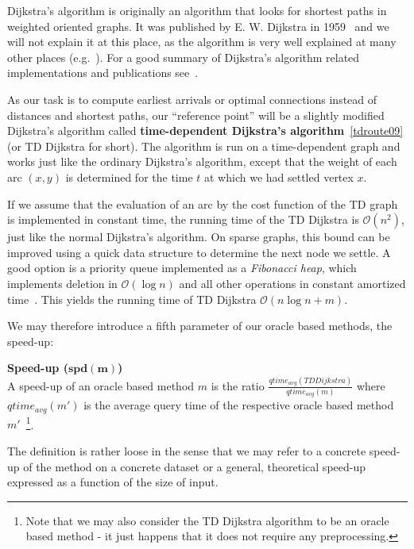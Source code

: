 	Dijkstra's algorithm is originally an algorithm that looks for shortest paths in weighted oriented graphs. It was published by E. W. Dijkstra in 1959~\cite{dijkstra59} and we will not explain it at this place, as the algorithm is very well explained at many other places (e.g.~\cite{dijkstraexp}). For a good summary of Dijkstra's algorithm related implementations and publications see~\cite{sommerthesis10}.
	
	As our task is to compute earliest arrivals or optimal connections instead of distances and shortest paths, our ``reference point'' will be a slightly modified Dijkstra's algorithm called \textbf{time-dependent Dijkstra's algorithm}~\ref{tdroute09} (or TD Dijkstra for short). The algorithm is run on a time-dependent graph and works just like the ordinary Dijkstra's algorithm, except that the weight of each arc $(x, y)$ is determined for the time $t$ at which we had settled vertex $x$.
	
	If we assume that the evaluation of an arc by the cost function of the TD graph is implemented in constant time, the running time of the TD Dijkstra is $\mathcal{O}(n^{2})$, just like the normal Dijkstra's algorithm. On sparse graphs, this bound can be improved using a quick data structure to determine the next node we settle. A good option is a priority queue implemented as a \textit{Fibonacci heap}, which implements deletion in $\mathcal{O}(\log n)$ and all other operations in constant amortized time~\cite{sommerthesis10}. This yields the running time of TD Dijkstra $\mathcal{O}(n \log n + m)$.
	
	We may therefore introduce a fifth parameter of our oracle based methods, the speed-up:
	
	\begin{definition}
		\textbf{Speed-up ($\bm{spd(m)}$)}\\
        A speed-up of an oracle based method $m$ is the ratio $\frac{\displaystyle qtime_{avg}(TD Dijkstra)}{\displaystyle qtime_{avg}(m)}$ where $qtime_{avg}(m')$ is the average query time of the respective oracle based method $m'$~\footnote{Note that we may also consider the TD Dijkstra algorithm to be an oracle based method - it just happens that it does not require any preprocessing.}.
	\end{definition}
	
	\noindent The definition is rather loose in the sense that we may refer to a concrete speed-up of the method on a concrete dataset or a general, theoretical speed-up expressed as a function of the size of input.
	
	
	
	
	